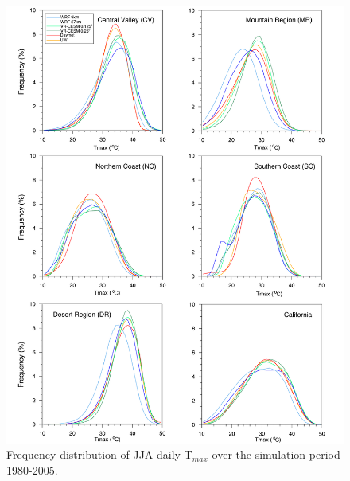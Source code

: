 \documentclass[draft,ms]{agutex}   %
\begin{document}
\begin{figure}
\begin{center}
\includegraphics[width=6in]{PDF_t2max_allzones_JJA.pdf}
\end{center}
\caption{Frequency distribution of JJA daily T$_{max}$ over the simulation period 1980-2005.} \label{fig:Figure 8}
\end{figure}
\end{document}
